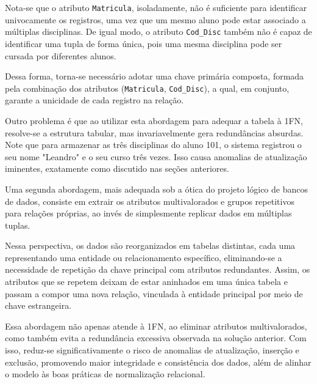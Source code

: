 \begin{tcolorbox}[breakable, colback=blue!5,colframe=blue!40!black,title=Situação exemplo]
    Nota-se que o atributo \texttt{Matricula}, isoladamente, não é suficiente para identificar univocamente os registros, uma vez que um mesmo aluno pode estar associado a múltiplas disciplinas. De igual modo, o atributo \texttt{Cod\_Disc} também não é capaz de identificar uma tupla de forma única, pois uma mesma disciplina pode ser cursada por diferentes alunos.

    Dessa forma, torna-se necessário adotar uma chave primária composta, formada pela combinação dos atributos (\texttt{Matricula}, \texttt{Cod\_Disc}), a qual, em conjunto, garante a unicidade de cada registro na relação.

    Outro problema é que ao utilizar esta abordagem para adequar a tabela à 1FN, resolve-se a estrutura tabular, mas invariavelmente gera redundâncias absurdas. Note que para armazenar as três disciplinas do aluno 101, o sistema registrou o seu nome "Leandro" e o seu curso três vezes. Isso causa anomalias de atualização iminentes, exatamente como discutido nas seções anteriores. 
\end{tcolorbox}

Uma segunda abordagem, mais adequada sob a ótica do projeto lógico de bancos de dados, consiste em extrair os atributos multivalorados e grupos repetitivos para relações próprias, ao invés de simplesmente replicar dados em múltiplas tuplas.\cite{angelotti2010banco}

Nessa perspectiva, os dados são reorganizados em tabelas distintas, cada uma representando uma entidade ou relacionamento específico, eliminando-se a necessidade de repetição da chave principal com atributos redundantes. Assim, os atributos que se repetem deixam de estar aninhados em uma única tabela e passam a compor uma nova relação, vinculada à entidade principal por meio de chave estrangeira.

Essa abordagem não apenas atende à 1FN, ao eliminar atributos multivalorados, como também evita a redundância excessiva observada na solução anterior. Com isso, reduz-se significativamente o risco de anomalias de atualização, inserção e exclusão, promovendo maior integridade e consistência dos dados, além de alinhar o modelo às boas práticas de normalização relacional.

